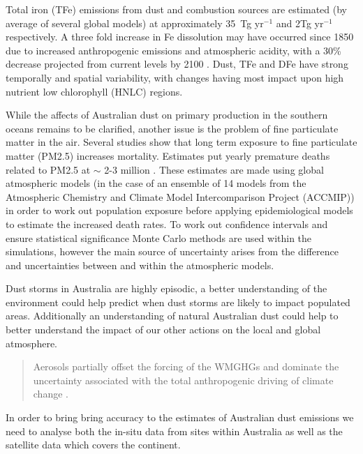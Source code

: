 Total iron (TFe) emissions from dust and combustion sources are estimated (by average of several global models) at approximately 35~Tg yr$^{-1}$ and 2Tg yr$^{-1}$ respectively. A three fold increase in Fe dissolution may have occurred since 1850 due to increased anthropogenic emissions and atmospheric acidity, with a 30\% decrease projected from current levels by 2100 \cite{Myriokefalitakis_2015}.
Dust, TFe and DFe have strong temporally and spatial variability, with changes having most impact upon high nutrient low chlorophyll (HNLC) regions.

While the affects of Australian dust on primary production in the southern oceans remains to be clarified, another issue is the problem of fine particulate matter in the air.
Several studies show that long term exposure to fine particulate matter (PM2.5) increases mortality. 
Estimates put yearly premature deaths related to PM2.5 at $\sim$ 2-3 million \cite{Hoek_2013, 19627030, Silva_2013, Lelieveld_2015}.   
These estimates are made using global atmospheric models (in the case of \citet{Silva_2013} an ensemble of 14 models from the Atmospheric Chemistry and Climate Model Intercomparison Project (ACCMIP)) in order to work out population exposure before applying epidemiological models to estimate the increased death rates.
To work out confidence intervals and ensure statistical significance Monte Carlo methods are used within the simulations, however the main source of uncertainty arises from the difference and uncertainties between and within the atmospheric models.

Dust storms in Australia are highly episodic, a better understanding of the environment could help predict when dust storms are likely to impact populated areas.
Additionally an understanding of natural Australian dust could help to better understand the impact of our other actions on the local and global atmosphere. 
\begin{quote}
Aerosols partially offset the forcing of the WMGHGs and dominate the uncertainty associated with the total anthropogenic driving of climate change \cite{IPCC_2013_chap8}.
\end{quote}
In order to bring bring accuracy to the estimates of Australian dust emissions we need to analyse both the in-situ data from sites within Australia as well as the satellite data which covers the continent.
